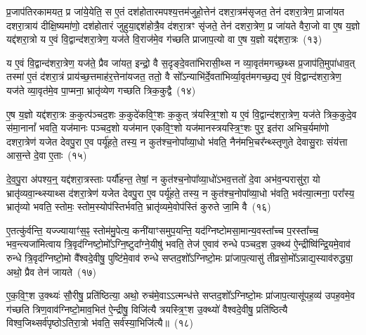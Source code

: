 प्र॒जा\-प॑तिरकामयत॒ प्र जा॑ये॒येति॒ स ए॒तं दश॑होतारमपश्य॒त्तम॑जुहो॒त्तेन॑ दशरा॒त्रम॑सृजत॒ तेन॑ दशरा॒त्रेण॒ प्राजा॑यत दशरा॒त्राय॑ दीक्षि॒ष्यमा॑णो॒ दश॑होतारं जुहुया॒द्दश॑होत्रै॒व द॑शरा॒त्रꣳ सृ॑जते॒ तेन॑ दशरा॒त्रेण॒ प्र जा॑यते वैरा॒जो वा ए॒ष य॒ज्ञो यद्द॑शरा॒त्रो य ए॒वं वि॒द्वान्द॑शरा॒त्रेण॒ यज॑ते वि॒राज॑मे॒व ग॑च्छति प्राजाप॒त्यो वा ए॒ष य॒ज्ञो यद्द॑शरा॒त्रः~(१३)\ip

य ए॒वं वि॒द्वान्द॑शरा॒त्रेण॒ यज॑ते॒ प्रैव जा॑यत॒ इन्द्रो॒ वै स॒दृङ्दे॒वता॑भिरासी॒थ्स न व्या॒वृत॑मगच्छ॒थ्स प्र॒जा\-प॑ति॒मुपा॑धाव॒त् तस्मा॑ ए॒तं द॑शरा॒त्रं प्राय॑च्छ॒त्तमाह॑र॒त्तेना॑यजत॒ ततो॒ वै सो᳚\-ऽन्याभि॑र्दे॒वता॑भिर्व्या॒वृत॑मगच्छ॒द्य ए॒वं वि॒द्वान्द॑शरा॒त्रेण॒ यज॑ते व्या॒वृत॑मे॒व पा॒प्मना॒ भ्रातृ॑व्येण गच्छति त्रिक॒कुद्वै~(१४)\ip

ए॒ष य॒ज्ञो यद्द॑शरा॒त्रः क॒कुत्प॑ञ्चद॒शः क॒कुदे॑कवि॒ꣳ॒शः क॒कुत् त्र॑यस्त्रि॒ꣳ॒शो य ए॒वं वि॒द्वान्द॑शरा॒त्रेण॒ यज॑ते त्रिक॒कुदे॒व स॑मा॒नानां᳚ भवति॒ यज॑मानः पञ्चद॒शो यज॑मान एकवि॒ꣳ॒शो यज॑मानस्त्रयस्त्रि॒ꣳ॒शः पुर॒ इत॑रा अभिच॒र्यमा॑णो दशरा॒त्रेण॑ यजेत देवपु॒रा ए॒व पर्यू॑हते॒ तस्य॒ न कुत॑श्च॒नोपा᳚व्या॒धो भ॑वति॒ नैन॑मभि॒चर᳚न्थ्स्तृणुते देवासु॒राः संय॑त्ता आस॒न्ते दे॒वा ए॒ताः~(१५)\ip

दे॒व॒पु॒रा अ॑पश्य॒न्॒ यद्द॑शरा॒त्रस्ताः पर्यौ॑हन्त॒ तेषां॒ न कुत॑श्च॒नोपा᳚व्या॒धो॑\-ऽभव॒त्ततो॑ दे॒वा अभ॑व॒न्परासु॑रा॒ यो भ्रातृ॑व्यवा॒न्थ्स्याथ्स द॑शरा॒त्रेण॑ यजेत देवपु॒रा ए॒व पर्यू॑हते॒ तस्य॒ न कुत॑श्च॒नोपा᳚व्या॒धो भ॑वति॒ भव॑त्या॒त्मना॒ परा᳚स्य॒ भ्रातृ॑व्यो भवति॒ स्तोमः॒ स्तोम॒स्योप॑स्तिर्भवति॒ भ्रातृ॑व्यमे॒वोप॑स्तिं कुरुते जा॒मि वै~(१६)\ip

ए॒तत्कु॑र्वन्ति॒ यज्ज्यायाꣳ॑स॒ꣴ॒ स्तोम॑मु॒पेत्य॒ कनी॑याꣳसमुप॒यन्ति॒ यद॑ग्निष्टोमसा॒मान्य॒वस्ता᳚च्च प॒रस्ता᳚च्च॒ भव॒न्त्यजा॑मित्वाय त्रि॒वृद॑ग्निष्टो॒मो᳚\-ऽग्नि॒ष्टुदा᳚ग्ने॒यीषु॑ भवति॒ तेज॑ ए॒वाव॑ रुन्धे पञ्चद॒श उ॒क्थ्य॑ ऐ॒न्द्रीष्वि॑न्द्रि॒यमे॒वाव॑ रुन्धे त्रि॒वृद॑ग्निष्टो॒मो वै᳚श्वदे॒वीषु॒ पुष्टि॑मे॒वाव॑ रुन्धे सप्तद॒शो᳚\-ऽग्निष्टो॒मः प्रा॑जाप॒त्यासु॑ तीव्रसो॒मो᳚\-ऽन्नाद्य॒स्याव॑रुद्ध्या॒ अथो॒ प्रैव तेन॑ जायते~(१७)\ip

ए॒क॒वि॒ꣳ॒श उ॒क्थ्यः॑ सौ॒रीषु॒ प्रति॑ष्ठित्या॒ अथो॒ रुच॑मे॒वा\-ऽऽ\-त्मन्ध॑त्ते सप्तद॒शो᳚\-ऽग्निष्टो॒मः प्रा॑जाप॒त्यासू॑पह॒व्य॑ उपह॒वमे॒व ग॑च्छति त्रिण॒वाव॑ग्निष्टो॒माव॒भित॑ ऐ॒न्द्रीषु॒ विजि॑त्यै त्रयस्त्रि॒ꣳ॒श उ॒क्थ्यो॑ वैश्वदे॒वीषु॒ प्रति॑ष्ठित्यै विश्व॒जिथ्सर्व॑पृष्ठो\-ऽतिरा॒त्रो भ॑वति॒ सर्व॑स्या॒भिजि॑त्यै॥~(१८)\ip

{\anuvakamend[{प्रा॒जा॒प॒त्यो वा ए॒ष य॒ज्ञो यद्द॑शरा॒त्रस्त्रि॑क॒कुद्वा ए॒ता वै जा॑यत॒ एक॑त्रिꣳशच्च}]}

